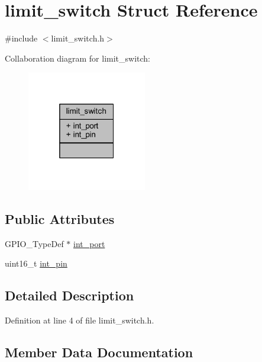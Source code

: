 \hypertarget{structlimit__switch}{}\section{limit\+\_\+switch Struct Reference}
\label{structlimit__switch}


{\ttfamily \#include $<$limit\+\_\+switch.\+h$>$}



Collaboration diagram for limit\+\_\+switch\+:
\nopagebreak
\begin{figure}[H]
\begin{center}
\leavevmode
\includegraphics[width=148pt]{structlimit__switch__coll__graph}
\end{center}
\end{figure}
\subsection*{Public Attributes}
\begin{DoxyCompactItemize}
\item 
G\+P\+I\+O\+\_\+\+Type\+Def $\ast$ \mbox{\hyperlink{structlimit__switch_af6b264126ee9bb617adac15907978946}{int\+\_\+port}}
\item 
uint16\+\_\+t \mbox{\hyperlink{structlimit__switch_afd7e2c4af92e7a26ee230578c98a2d67}{int\+\_\+pin}}
\end{DoxyCompactItemize}


\subsection{Detailed Description}


Definition at line 4 of file limit\+\_\+switch.\+h.



\subsection{Member Data Documentation}
\mbox{\label{structlimit__switch_afd7e2c4af92e7a26ee230578c98a2d67}} 
